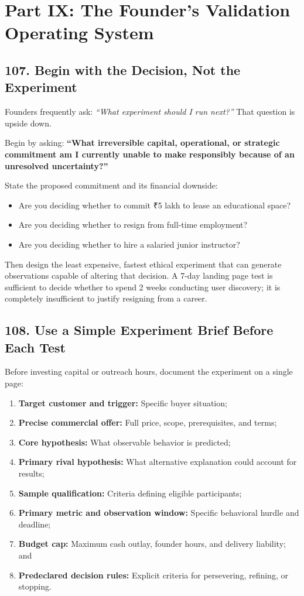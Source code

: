 \section*{Part IX: The Founder's Validation Operating System}

\subsection*{107. Begin with the Decision, Not the Experiment}

Founders frequently ask: \emph{``What experiment should I run next?''} That question is upside down.

Begin by asking: \textbf{``What irreversible capital, operational, or strategic commitment am I currently unable to make responsibly because of an unresolved uncertainty?''}

State the proposed commitment and its financial downside:
\begin{itemize}
    \item Are you deciding whether to commit ₹5 lakh to lease an educational space?
    \item Are you deciding whether to resign from full-time employment?
    \item Are you deciding whether to hire a salaried junior instructor?
\end{itemize}

Then design the least expensive, fastest ethical experiment that can generate observations capable of altering that decision. A 7-day landing page test is sufficient to decide whether to spend 2 weeks conducting user discovery; it is completely insufficient to justify resigning from a career.

\subsection*{108. Use a Simple Experiment Brief Before Each Test}

Before investing capital or outreach hours, document the experiment on a single page:
\begin{enumerate}
    \item \textbf{Target customer and trigger:} Specific buyer situation;
    \item \textbf{Precise commercial offer:} Full price, scope, prerequisites, and terms;
    \item \textbf{Core hypothesis:} What observable behavior is predicted;
    \item \textbf{Primary rival hypothesis:} What alternative explanation could account for results;
    \item \textbf{Sample qualification:} Criteria defining eligible participants;
    \item \textbf{Primary metric and observation window:} Specific behavioral hurdle and deadline;
    \item \textbf{Budget cap:} Maximum cash outlay, founder hours, and delivery liability; and
    \item \textbf{Predeclared decision rules:} Explicit criteria for persevering, refining, or stopping.
\end{enumerate}

